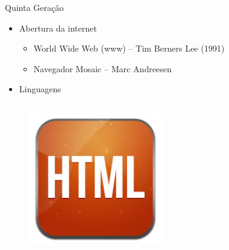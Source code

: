 \documentclass[aspectratio=169,
				xcolor=table]{beamer}
\begin{document}
	\begin{frame}{Quinta Geração}
		\begin{itemize}
			\item Abertura da internet
			\begin{itemize}
			 	\item World Wide Web (www) – Tim Berners Lee (1991)
			 	\item Navegador Mosaic – Marc Andreesen
			 \end{itemize} 
			\vspace{1em}
			\item Linguagens
		\end{itemize}
		\vspace{-1em}
		\begin{columns}
			\begin{column}{0.23\textwidth}
				\begin{figure}
					\centering
					\includegraphics[width=0.8\textwidth, keepaspectratio]{../figs/cap03/linguagemhtml} 			
				\end{figure}
			\end{column}
			\begin{column}{0.23\textwidth}
				\begin{figure}
					\centering

\end{figure}
\end{column}
\end{columns}
\end{frame}
\end{document}
